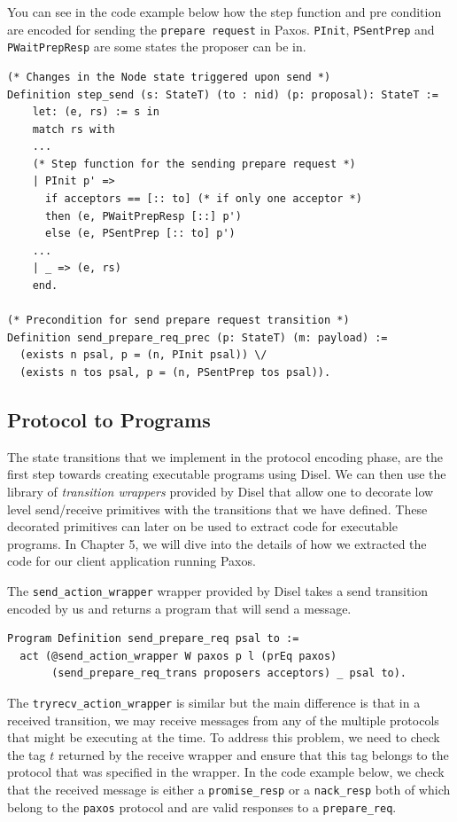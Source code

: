 You can see in the code example below how the step function and pre condition
are encoded for sending the \texttt{prepare request} in Paxos. \texttt{PInit},
\texttt{PSentPrep} and \texttt{PWaitPrepResp} are some states the
proposer can be in.

\begin{lstlisting}
(* Changes in the Node state triggered upon send *)
Definition step_send (s: StateT) (to : nid) (p: proposal): StateT :=
    let: (e, rs) := s in
    match rs with
    ...
    (* Step function for the sending prepare request *)
    | PInit p' =>
      if acceptors == [:: to] (* if only one acceptor *)
      then (e, PWaitPrepResp [::] p')
      else (e, PSentPrep [:: to] p')
    ...
    | _ => (e, rs)
    end.

(* Precondition for send prepare request transition *)
Definition send_prepare_req_prec (p: StateT) (m: payload) :=
  (exists n psal, p = (n, PInit psal)) \/
  (exists n tos psal, p = (n, PSentPrep tos psal)).
\end{lstlisting}

\subsection{Protocol to Programs}
The state transitions that we implement in the protocol encoding phase, are the
first step towards creating executable programs using Disel.
We can then use the library of \textit{transition wrappers} provided by Disel
that allow one to decorate low level send/receive primitives with the transitions
that we have defined. These decorated primitives can later on be used to extract
code for executable programs. In Chapter 5, we will dive into the details of
how we extracted the code for our client application running Paxos.

The \texttt{send\_action\_wrapper} wrapper provided by Disel takes a send transition encoded
by us and returns a program that will send a message.
\begin{lstlisting}
Program Definition send_prepare_req psal to :=
  act (@send_action_wrapper W paxos p l (prEq paxos)
       (send_prepare_req_trans proposers acceptors) _ psal to).
\end{lstlisting}

The \texttt{tryrecv\_action\_wrapper} is similar but the main difference is that in
a received transition, we may receive messages from any of the multiple protocols
that might be executing at the time. To address this problem, we need to check the
tag $t$ returned by the receive wrapper and ensure that this tag belongs to the
protocol that was specified in the wrapper. In the code example below, we check
that the received message is either a \texttt{promise\_resp} or a \texttt{nack\_resp}
both of which belong to the \texttt{paxos} protocol and are valid responses to a
\texttt{prepare\_req}.


